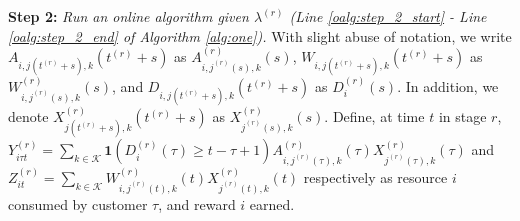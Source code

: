 \documentclass[letterpaper, 10 pt, conference]{ieeeconf}  %
\newcommand{\III}{\mathcal{I}}
\newcommand{\KKK}{\mathcal{K}}
\theoremstyle{plain}
\theoremstyle{definition}
\theoremstyle{remark}
\begin{document}
\textbf{Step 2:} \emph{Run an online algorithm given $\lambda^{(r)}$ (Line \ref{oalg:step_2_start} - Line \ref{oalg:step_2_end} of Algorithm \ref{alg:one}).} With slight abuse of notation, we write $A_{i,j(t^{(r)}+s),k}(t^{(r)}+s)$ as $A^{(r)}_{i,j^{(r)}(s),k}(s)$, $W_{i,j(t^{(r)}+s),k}(t^{(r)}+s)$ as $W^{(r)}_{i,j^{(r)}(s),k}(s)$, and $D_{i,j(t^{(r)}+s),k}(t^{(r)}+s)$ as $D^{(r)}_{i}(s)$. In addition, we denote $X^{(r)}_{j(t^{(r)}+s),k}(t^{(r)}+s)$ as  $X^{(r)}_{j^{(r)}(s),k}(s)$. Define, at time $t$ in stage $r$, $Y^{(r)}_{i \tau t} = \sum_{k \in \KKK} \mathbf{1}(D^{(r)}_{i}(\tau) \geq t - \tau +1) A^{(r)}_{i,j^{(r)}(\tau),k}(\tau) X^{(r)}_{j^{(r)}(\tau),k}(\tau)$ and $Z^{(r)}_{it} = \sum_{k \in \KKK} W^{(r)}_{i,j^{(r)}(t),k}(t) X^{(r)}_{j^{(r)}(t),k}(t)$ respectively as resource $i$ consumed by customer $\tau$, and reward $i$ earned. %
\end{document}
